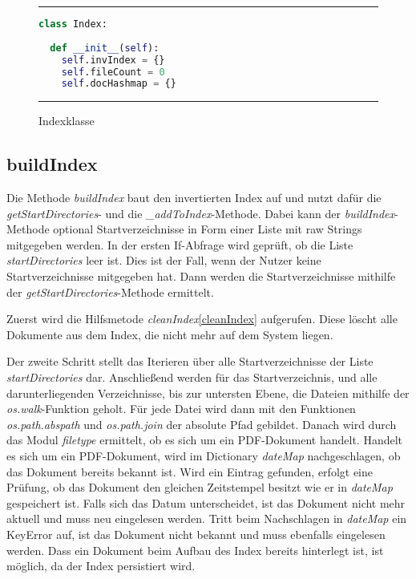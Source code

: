 \begin{figure}
	\rule{\textwidth}{0.4pt}
		\begin{lstlisting}[language=Python]
class Index:
  
  def __init__(self):
    self.invIndex = {}
    self.fileCount = 0
    self.docHashmap = {}
		\end{lstlisting}
	\rule{\textwidth}{0.4pt}
	\caption{Indexklasse}
	\label{fig:index}
\end{figure}

\subsection{buildIndex}\label{buildindex}

Die Methode \emph{buildIndex} baut den invertierten Index auf und nutzt dafür die\\
\textit{getStartDirectories}- und die \textit{\_addToIndex}-Methode. Dabei kann der \textit{buildIndex}-Methode optional Startverzeichnisse in Form einer Liste mit raw Strings mitgegeben werden. In der ersten If-Abfrage wird geprüft, ob die Liste \textit{startDirectories} leer ist. Dies ist der Fall, wenn der Nutzer keine Startverzeichnisse mitgegeben hat. Dann werden die Startverzeichnisse mithilfe der \textit{getStartDirectories}-Methode ermittelt.

Zuerst wird die Hilfsmetode \textit{cleanIndex}\ref{cleanIndex} aufgerufen. Diese löscht alle Dokumente aus dem Index, die nicht mehr auf dem System liegen.

Der zweite Schritt stellt das Iterieren über alle Startverzeichnisse der Liste \textit{startDirectories} dar. Anschließend werden für das Startverzeichnis, und alle darunterliegenden Verzeichnisse, bis zur untersten Ebene, die Dateien mithilfe der \textit{os.walk}-Funktion geholt. Für jede Datei wird dann mit den Funktionen \textit{os.path.abspath} und \textit{os.path.join} der absolute Pfad gebildet. Danach wird durch das Modul \textit{filetype} ermittelt, ob es sich um ein PDF-Dokument handelt. Handelt es sich um ein PDF-Dokument, wird im Dictionary \textit{dateMap} nachgeschlagen, ob das Dokument bereits bekannt ist. Wird ein Eintrag gefunden, erfolgt eine Prüfung, ob das Dokument den gleichen Zeitstempel besitzt wie er in \textit{dateMap} gespeichert ist. Falls sich das Datum unterscheidet, ist das Dokument nicht mehr aktuell und muss neu eingelesen werden. Tritt beim Nachschlagen in \textit{dateMap} ein KeyError auf, ist das Dokument nicht bekannt und muss ebenfalls eingelesen werden. Dass ein Dokument beim Aufbau des Index bereits hinterlegt ist, ist möglich, da der Index persistiert wird. 


